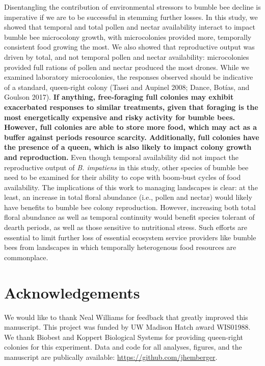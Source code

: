 \documentclass[11pt,]{article}
\begin{document}
Disentangling the contribution of environmental stressors to bumble bee
decline is imperative if we are to be successful in stemming further
losses. In this study, we showed that temporal and total pollen and
nectar availability interact to impact bumble bee microcolony growth,
with microcolonies provided more, temporally consistent food growing the
most. We also showed that reproductive output was driven by total, and
not temporal pollen and nectar availability: microcolonies provided full
rations of pollen and nectar produced the most drones. While we examined
laboratory microcolonies, the responses observed should be indicative of
a standard, queen-right colony (Tasei and Aupinel 2008; Dance, Botías,
and Goulson 2017). \textbf{If anything, free-foraging full colonies may
exhibit exacerbated responses to similar treatments, given that foraging
is the most energetically expensive and risky activity for bumble bees.
However, full colonies are able to store more food, which may act as a
buffer against periods resource scarcity. Additionally, full colonies
have the presence of a queen, which is also likely to impact colony
growth and reproduction.} Even though temporal availability did not
impact the reproductive output of \emph{B. impatiens} in this study,
other species of bumble bee need to be examined for their ability to
cope with boom-bust cycles of food availability. The implications of
this work to managing landscapes is clear: at the least, an increase in
total floral abundance (i.e., pollen and nectar) would likely have
benefits to bumble bee colony reproduction. However, increasing both
total floral abundance as well as temporal continuity would benefit
species tolerant of dearth periods, as well as those sensitive to
nutritional stress. Such efforts are essential to limit further loss of
essential ecosystem service providers like bumble bees from landscapes
in which temporally heterogenous food resources are commonplace.

\hypertarget{acknowledgements}{%
\section{Acknowledgements}\label{acknowledgements}}

We would like to thank Neal Williams for feedback that greatly improved
this manuscript. This project was funded by UW Madison Hatch award
WIS01988. We thank Biobest and Koppert Biological Systems for providing
queen-right colonies for this experiment. Data and code for all
analyses, figures, and the manuscript are publically available:
\url{https://github.com/jhemberger}.
\end{document}
